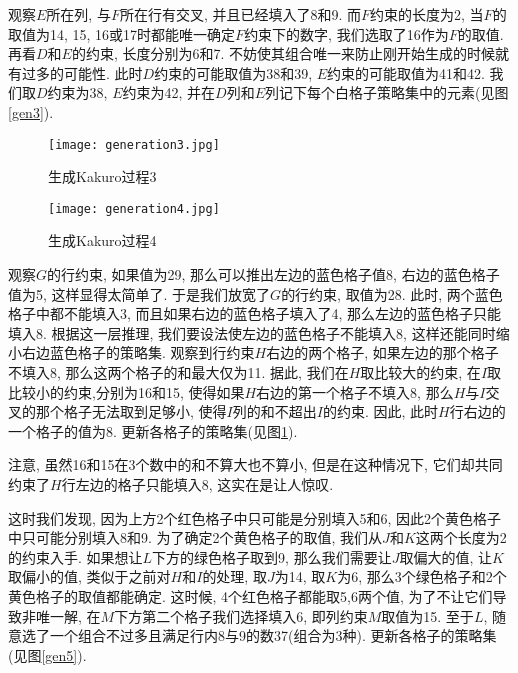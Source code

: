             观察$E$所在列, 与$F$所在行有交叉, 并且已经填入了8和9.
            而$F$约束的长度为2, 当$F$的取值为14, 15, 16或17时都能唯一确定$F$约束下的数字,
            我们选取了16作为$F$的取值.
            再看$D$和$E$的约束, 长度分别为6和7.
            不妨使其组合唯一来防止刚开始生成的时候就有过多的可能性.
            此时$D$约束的可能取值为38和39, $E$约束的可能取值为41和42.
            我们取$D$约束为38, $E$约束为42,
            并在$D$列和$E$列记下每个白格子策略集中的元素(见图\ref{gen3}).

            \begin{figure}[htb]
                \begin{minipage}[t]{0.49\linewidth}
                    \centering
                    \texttt{[image: generation3.jpg]}
                    \caption[生成3]{生成Kakuro过程3}\label{gen3}
                \end{minipage}
                \begin{minipage}[t]{0.49\linewidth}
                    \centering
                    \texttt{[image: generation4.jpg]}
                    \caption[生成4]{生成Kakuro过程4}\label{gen4}
                \end{minipage}
            \end{figure}

            观察$G$的行约束, 如果值为29, 那么可以推出左边的蓝色格子值8,
            右边的蓝色格子值为5, 这样显得太简单了.
            于是我们放宽了$G$的行约束, 取值为28.
            此时, 两个蓝色格子中都不能填入3,
            而且如果右边的蓝色格子填入了4, 那么左边的蓝色格子只能填入8.
            根据这一层推理, 我们要设法使左边的蓝色格子不能填入8,
            这样还能同时缩小右边蓝色格子的策略集.
            观察到行约束$H$右边的两个格子, 如果左边的那个格子不填入8,
            那么这两个格子的和最大仅为11.
            据此, 我们在$H$取比较大的约束, 在$I$取比较小的约束,分别为16和15,
            使得如果$H$右边的第一个格子不填入8, 那么$H$与$I$交叉的那个格子无法取到足够小,
            使得$I$列的和不超出$I$的约束.
            因此, 此时$H$行右边的一个格子的值为8. 更新各格子的策略集(见图\ref{gen4}).

            注意, 虽然16和15在3个数中的和不算大也不算小,
            但是在这种情况下, 它们却共同约束了$H$行左边的格子只能填入8,
            这实在是让人惊叹.

            这时我们发现, 因为上方2个红色格子中只可能是分别填入5和6,
            因此2个黄色格子中只可能分别填入8和9.
            为了确定2个黄色格子的取值, 我们从$J$和$K$这两个长度为2的约束入手.
            如果想让$L$下方的绿色格子取到9, 那么我们需要让$J$取偏大的值, 让$K$取偏小的值,
            类似于之前对$H$和$I$的处理, 取$J$为14, 取$K$为6,
            那么3个绿色格子和2个黄色格子的取值都能确定.
            这时候, 4个红色格子都能取5,6两个值, 为了不让它们导致非唯一解,
            在$M$下方第二个格子我们选择填入6, 即列约束$M$取值为15.
            至于$L$, 随意选了一个组合不过多且满足行内8与9的数37(组合为3种).
            更新各格子的策略集(见图\ref{gen5}).

